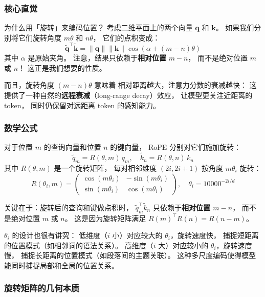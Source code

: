 \subsubsection{核心直觉}

为什么用「旋转」来编码位置？
考虑二维平面上的两个向量 $\mathbf{q}$ 和 $\mathbf{k}$。
如果我们分别将它们旋转角度 $m\theta$ 和 $n\theta$，
它们的点积变成：
\[
  \tilde{\mathbf{q}}^\top \tilde{\mathbf{k}}
  = \|\mathbf{q}\| \|\mathbf{k}\| \cos(\alpha + (m-n)\theta)
\]
其中 $\alpha$ 是原始夹角。
注意，结果只依赖于\textbf{相对位置} $m - n$，
而不是绝对位置 $m$ 或 $n$！
这正是我们想要的性质。

而且，旋转角度 $(m-n)\theta$ 意味着
相对距离越大，注意力分数的衰减越快：
这提供了一种自然的\textbf{远程衰减}（long-range decay）效应，
让模型更关注近距离的 token，
同时仍保留对远距离 token 的感知能力。

\subsubsection{数学公式}

对于位置 $m$ 的查询向量和位置 $n$ 的键向量，
RoPE 分别对它们施加旋转：
\begin{equation}
  \tilde{q}_m = R(\theta, m) \, q_m, \quad
  \tilde{k}_n = R(\theta, n) \, k_n
\end{equation}
其中 $R(\theta, m)$ 是一个旋转矩阵，
每对相邻维度 $(2i, 2i+1)$ 按角度 $m \theta_i$ 旋转：
\begin{equation}
  R(\theta_i, m) = \begin{pmatrix}
    \cos(m \theta_i) & -\sin(m \theta_i) \\
    \sin(m \theta_i) & \cos(m \theta_i)
  \end{pmatrix}, \quad
  \theta_i = 10000^{-2i/d}
\end{equation}

关键在于：旋转后的查询和键做点积时，
$\tilde{q}_m^\top \tilde{k}_n$ 只依赖于\textbf{相对位置 $m - n$}，
而不是绝对位置 $m$ 或 $n$。
这是因为旋转矩阵满足 $R(m)^\top R(n) = R(n - m)$。

$\theta_i$ 的设计也很有讲究：
低维度（$i$ 小）对应较大的 $\theta_i$，旋转速度快，
捕捉短距离的位置模式（如相邻词的语法关系）。
高维度（$i$ 大）对应较小的 $\theta_i$，旋转速度慢，
捕捉长距离的位置模式（如段落间的主题关联）。
这种多尺度编码使得模型能同时捕捉局部和全局的位置关系。

\subsubsection{旋转矩阵的几何本质}

